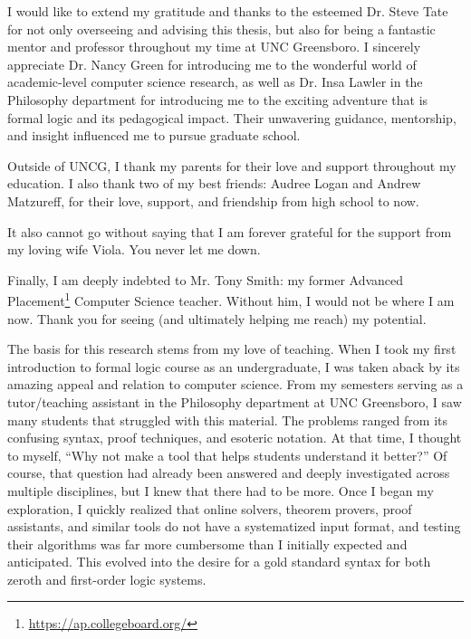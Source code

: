 \documentclass[ms]{uncgdissertationexp2}
\theoremstyle{plain}
\theoremstyle{definition}
\theoremstyle{remark}
\begin{document}
\begin{acknowledgments}
	I would like to extend my gratitude and thanks to the esteemed Dr. Steve Tate for not only overseeing and advising this thesis, but also for being a fantastic mentor and professor throughout my time at UNC Greensboro. I sincerely appreciate Dr. Nancy Green for introducing me to the wonderful world of academic-level computer science research, as well as Dr. Insa Lawler in the Philosophy department for introducing me to the exciting adventure that is formal logic and its pedagogical impact. Their unwavering guidance, mentorship, and insight influenced me to pursue graduate school.
	
	Outside of UNCG, I thank my parents for their love and support throughout my education. I also thank two of my best friends: Audree Logan and Andrew Matzureff, for their love, support, and friendship from high school to now.
	
	It also cannot go without saying that I am forever grateful for the support from my loving wife Viola. You never let me down.
	
	Finally, I am deeply indebted to Mr. Tony Smith: my former Advanced Placement\footnote{\url{https://ap.collegeboard.org/}} Computer Science teacher. Without him, I would not be where I am now. Thank you for seeing (and ultimately helping me reach) my potential.
\end{acknowledgments}

\begin{preface}
	The basis for this research stems from my love of teaching. When I took my first introduction to formal logic course as an undergraduate, I was taken aback by its amazing appeal and relation to computer science. From my semesters serving as a tutor/teaching assistant in the Philosophy department at UNC Greensboro, I saw many students that struggled with this material. The problems ranged from its confusing syntax, proof techniques, and esoteric notation. At that time, I thought to myself, ``Why not make a tool that helps students understand it better?'' Of course, that question had already been answered and deeply investigated across multiple disciplines, but I knew that there had to be more. Once I began my exploration, I quickly realized that online solvers, theorem provers, proof assistants, and similar tools do not have a systematized input format, and testing their algorithms was far more cumbersome than I initially expected and anticipated. This evolved into the desire for a gold standard syntax for both zeroth and first-order logic systems.
\end{preface}
\end{document}
